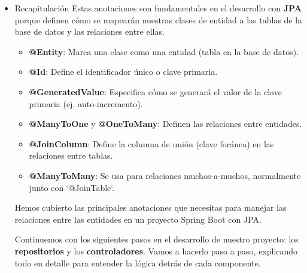 \documentclass[11pt]{article}
\begin{document}
\begin{itemize}
\begin{itemize}
\begin{itemize}
\textbf{\textbf{Ejemplo}}:
\begin{verbatim}
@ManyToMany
@JoinTable(
  name = "autor_libro",
  joinColumns = @JoinColumn(name = "libro_id"),
  inverseJoinColumns = @JoinColumn(name = "autor_id")
)
private List<Autor> autores;
\end{verbatim}
En este ejemplo:
\begin{itemize}
\item La anotación `@JoinTable` define la \textbf{\textbf{tabla intermedia}} llamada `autor\_libro`.
\item La columna `libro\_id` de la tabla intermedia apuntará a la tabla `Libro`, y la columna `autor\_id` apuntará a la tabla `Autor`.
\end{itemize}

Aunque en nuestro proyecto actual no tenemos un escenario de muchos-a-muchos, es útil entender cómo funciona esta relación.
\end{itemize}
\end{itemize}

\item Recapitulación
\label{sec:org109a3e2}
Estas anotaciones son fundamentales en el desarrollo con \textbf{\textbf{JPA}} porque definen cómo se mapearán nuestras clases de entidad a las tablas de la base de datos y las relaciones entre ellas.

\begin{itemize}
\item \textbf{\textbf{@Entity}}: Marca una clase como una entidad (tabla en la base de datos).
\item \textbf{\textbf{@Id}}: Define el identificador único o clave primaria.
\item \textbf{\textbf{@GeneratedValue}}: Especifica cómo se generará el valor de la clave primaria (ej. auto-incremento).
\item \textbf{\textbf{@ManyToOne}} y \textbf{\textbf{@OneToMany}}: Definen las relaciones entre entidades.
\item \textbf{\textbf{@JoinColumn}}: Define la columna de unión (clave foránea) en las relaciones entre tablas.
\item \textbf{\textbf{@ManyToMany}}: Se usa para relaciones muchos-a-muchos, normalmente junto con `@JoinTable`.
\end{itemize}

Hemos cubierto las principales anotaciones que necesitas para manejar las relaciones entre las entidades en un proyecto Spring Boot con JPA.



 Continuemos con los siguientes pasos en el desarrollo de nuestro
proyecto: los \textbf{\textbf{repositorios}} y los \textbf{\textbf{controladores}}.  Vamos a
hacerlo paso a paso, explicando todo en detalle para entender la
lógica detrás de cada componente.
\end{itemize}
\end{document}
